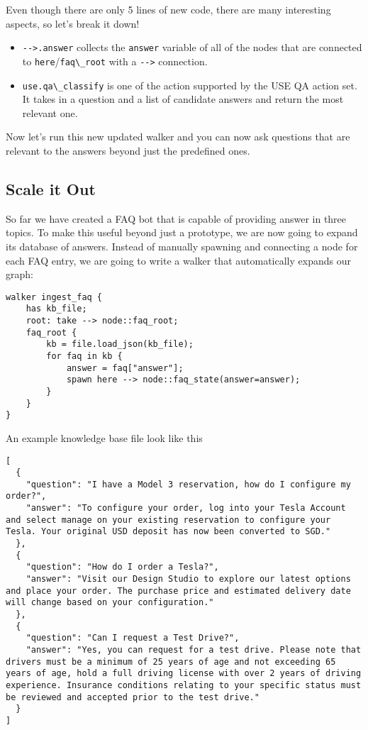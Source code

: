 Even though there are only 5 lines of new code, there are many
interesting aspects, so let's break it down!

\begin{itemize}
\tightlist
\item
  \passthrough{\lstinline!-->.answer!} collects the
  \passthrough{\lstinline!answer!} variable of all of the nodes that are
  connected to
  \passthrough{\lstinline!here!}/\passthrough{\lstinline!faq\_root!}
  with a \passthrough{\lstinline!-->!} connection.
\item
  \passthrough{\lstinline!use.qa\_classify!} is one of the action
  supported by the USE QA action set. It takes in a question and a list
  of candidate answers and return the most relevant one.
\end{itemize}

Now let's run this new updated walker and you can now ask questions that
are relevant to the answers beyond just the predefined ones.

\hypertarget{scale-it-out}{%
\subsection{Scale it Out}\label{scale-it-out}}

So far we have created a FAQ bot that is capable of providing answer in
three topics. To make this useful beyond just a prototype, we are now
going to expand its database of answers. Instead of manually spawning
and connecting a node for each FAQ entry, we are going to write a walker
that automatically expands our graph:

\begin{lstlisting}
walker ingest_faq {
    has kb_file;
    root: take --> node::faq_root;
    faq_root {
        kb = file.load_json(kb_file);
        for faq in kb {
            answer = faq["answer"];
            spawn here --> node::faq_state(answer=answer);
        }
    }
}
\end{lstlisting}

An example knowledge base file look like this

\begin{lstlisting}
[
  {
    "question": "I have a Model 3 reservation, how do I configure my order?",
    "answer": "To configure your order, log into your Tesla Account and select manage on your existing reservation to configure your Tesla. Your original USD deposit has now been converted to SGD."
  },
  {
    "question": "How do I order a Tesla?",
    "answer": "Visit our Design Studio to explore our latest options and place your order. The purchase price and estimated delivery date will change based on your configuration."
  },
  {
    "question": "Can I request a Test Drive?",
    "answer": "Yes, you can request for a test drive. Please note that drivers must be a minimum of 25 years of age and not exceeding 65 years of age, hold a full driving license with over 2 years of driving experience. Insurance conditions relating to your specific status must be reviewed and accepted prior to the test drive."
  }
]
\end{lstlisting}

